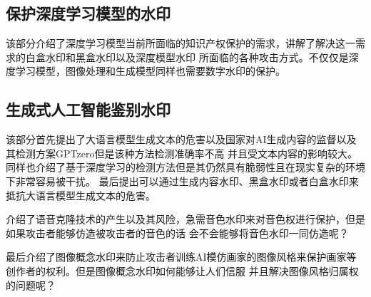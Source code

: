 \documentclass[a4paper,11pt,UTF8]{ctexart}
\begin{document}
  \subsection{保护深度学习模型的水印}
    该部分介绍了深度学习模型当前所面临的知识产权保护的需求，讲解了解决这一需求的白盒水印和黑盒水印以及深度模型水印
    所面临的各种攻击方式。不仅仅是深度学习模型，图像处理和生成模型同样也需要数字水印的保护。
  \subsection{生成式人工智能鉴别水印}
    该部分首先提出了大语言模型生成文本的危害以及国家对AI生成内容的监督以及其检测方案GPTzero但是该种方法检测准确率不高
    并且受文本内容的影响较大。同样也介绍了基于深度学习的检测方法但是其仍然具有脆弱性且在现实复杂的环境下非常容易被干扰。
    最后提出可以通过生成内容水印、黑盒水印或者白盒水印来抵抗大语言模型生成文本的危害。\par
    介绍了语音克隆技术的产生以及其风险，急需音色水印来对音色权进行保护，但是如果攻击者能够仿造被攻击者的音色的话
    会不会能够将音色水印一同仿造呢？\par
    最后介绍了图像概念水印来防止攻击者训练AI模仿画家的图像风格来保护画家等创作者的权利。但是图像概念水印如何能够让人们信服
    并且解决图像风格归属权的问题呢？
    

\vspace{4cm}
\end{document}
